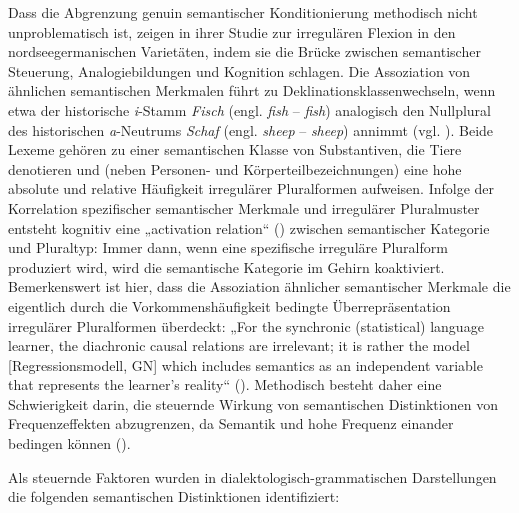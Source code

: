 Dass die Abgrenzung genuin semantischer Konditionierung methodisch nicht unproblematisch ist, zeigen \citet{VerslootAdamczyk2018} in ihrer Studie zur irregulären Flexion in den nordseegermanischen Varietäten, indem sie die Brücke zwischen semantischer Steuerung, Analogiebildungen und Kognition schlagen. Die Assoziation von ähnlichen semantischen Merkmalen führt zu Deklinationsklassenwechseln, wenn etwa der historische \textit{i}{}-Stamm \textit{Fisch} (engl. \textit{fish} -- \textit{fish}) analogisch den Nullplural des historischen \textit{a}{}-Neutrums \textit{Schaf} (engl. \textit{sheep} -- \textit{sheep}) annimmt (vgl. \citealt[49--50]{VerslootAdamczyk2018}). Beide Lexeme gehören zu einer semantischen Klasse von Substantiven, die Tiere denotieren und (neben Personen- und Körperteilbezeichnungen) eine hohe absolute und relative Häufigkeit irregulärer Pluralformen aufweisen. Infolge der Korrelation spezifischer semantischer Merkmale und irregulärer Pluralmuster entsteht kognitiv eine „activation relation“ (\citealt[50]{VerslootAdamczyk2018}) zwischen semantischer Kategorie und Pluraltyp: Immer dann, wenn eine spezifische irreguläre Pluralform produziert wird, wird die semantische Kategorie im Gehirn koaktiviert. Bemerkenswert ist hier, dass die Assoziation ähnlicher semantischer Merkmale die eigentlich durch die Vorkommenshäufigkeit bedingte Überrepräsentation irregulärer Pluralformen überdeckt: „For the synchronic (statistical) language learner, the diachronic causal relations are irrelevant; it is rather the model [Regressionsmodell, GN] which includes semantics as an independent variable that represents the learner’s reality“ (\citealt[50]{VerslootAdamczyk2018}). Methodisch besteht daher eine Schwierigkeit darin, die steuernde Wirkung von semantischen Distinktionen von Frequenzeffekten abzugrenzen, da Semantik und hohe Frequenz einander bedingen können (\citealt[26]{VerslootAdamczyk2018}).

Als steuernde Faktoren wurden in dialektologisch-grammatischen Darstellungen die folgenden semantischen Distinktionen identifiziert:

